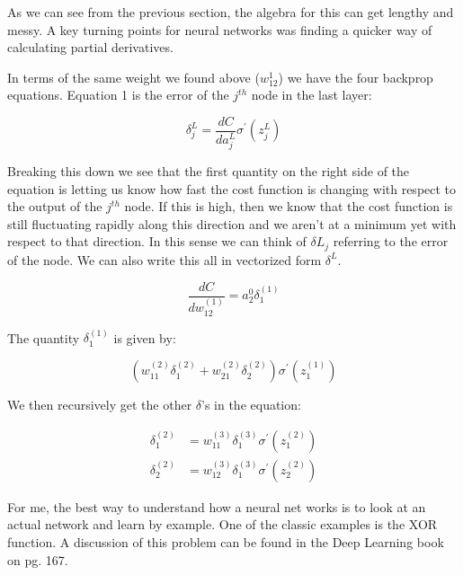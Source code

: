 As we can see from the previous section, the algebra for this can get lengthy and messy. A key turning points for neural networks was finding a quicker way of calculating partial derivatives. 

In terms of the same weight we found above ($w^{1}_{12}$) we have the four backprop equations. Equation 1 is the error of the $j^{th}$ node in the last layer:

\begin{equation}
\delta^{L}_j = \frac{dC}{da^L_j} \sigma^\prime(z_j^L)
\end{equation}

\noindent Breaking this down we see that the first quantity on the right side of the equation is letting us know how fast the cost function is changing with respect to the output of the $j^{th}$ node. If this is high, then we know that the cost function is still fluctuating rapidly along this direction and we aren't at a minimum yet with respect to that direction. In this sense we can think of $\delta{L}_j$ referring to the error of the node. We can also write this all in vectorized form $\delta^{L}$.




\begin{equation}
\frac{dC}{dw^{(1)}_{12}} = a_{2}^{0}\delta_1^{(1)}
\end{equation}

The quantity $\delta_1^{(1)}$ is given by:

\begin{equation}
(w_{11}^{(2)}\delta^{(2)}_1 + w_{21}^{(2)}\delta^{(2)}_2)\sigma^{\prime}(z_1^{(1)})
\end{equation}
 
 We then recursively get the other $\delta$'s in the equation:
 
 \begin{equation}
 \begin{split}
 \delta^{(2)}_1  & = w_{11}^{(3)}\delta_1^{(3)}\sigma^{\prime}(z_1^{(2)})\\
 \delta^{(2)}_2  & = w_{12}^{(3)}\delta_1^{(3)}\sigma^{\prime}(z_2^{(2)})
 \end{split}
 \end{equation}
 

 
 
 For me, the best way to understand how a neural net works is to look at an actual network and learn by example. One of the classic examples is the XOR function. A discussion of this problem can be found in the Deep Learning book on pg. 167.

